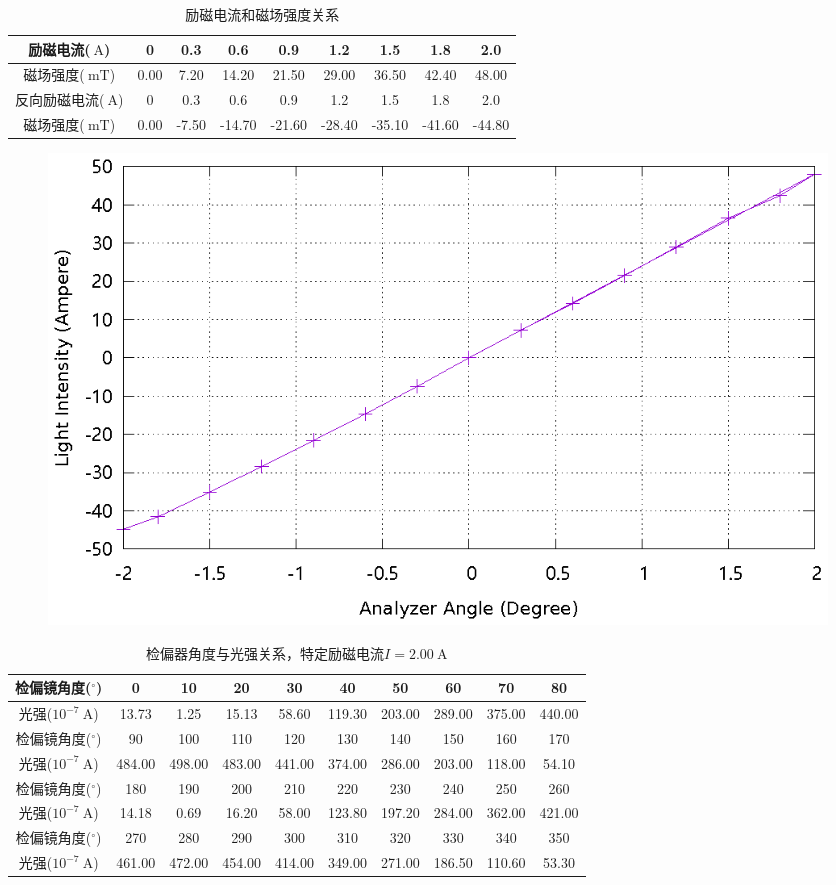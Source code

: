 \documentclass{ctexart}
\newcommand{\si}[1]{\  \mathrm{#1}}
\begin{document}
\newpage
\begin{table}[H]
    \centering
    \begin{tabular}{|c|c|c|c|c|c|c|c|c|}
        \hline
        励磁电流($\si{A}$)   & 0   & 0.3 & 0.6 & 0.9 & 1.2 & 1.5 & 1.8 & 2.0 \\\hline
        磁场强度($\si{mT}$)  & 0.00 & 7.20 & 14.20 & 21.50 & 29.00 & 36.50 & 42.40 & 48.00 \\\hline
        反向励磁电流($\si{A}$) & 0   & 0.3 & 0.6 & 0.9 & 1.2 & 1.5 & 1.8 & 2.0 \\\hline
        磁场强度($\si{mT}$)  & 0.00 & -7.50 & -14.70 & -21.60 & -28.40 & -35.10 & -41.60 & -44.80 \\\hline
    \end{tabular}
    \caption{励磁电流和磁场强度关系}
\end{table}
\begin{figure}[H]
    \centering
    \includegraphics[width=0.9\linewidth]{../output/current-mfield.gnuplot}
\end{figure}
\newpage
\begin{table}[H]
    \centering
    \begin{tabular}{|c|c|c|c|c|c|c|c|c|c|}
        \hline
        检偏镜角度(${}^{\circ}$)  & 0   & 10  & 20  & 30  & 40  & 50  & 60  & 70  & 80  \\\hline
        光强($10^{-7} \si{A}$) & 13.73 & 1.25 & 15.13 & 58.60 & 119.30 & 203.00 & 289.00 & 375.00 & 440.00 \\\hline
        检偏镜角度(${}^{\circ}$)  & 90  & 100 & 110 & 120 & 130 & 140 & 150 & 160 & 170 \\\hline
        光强($10^{-7} \si{A}$) & 484.00 & 498.00 & 483.00 & 441.00 & 374.00 & 286.00 & 203.00 & 118.00 & 54.10 \\\hline
        检偏镜角度(${}^{\circ}$)  & 180 & 190 & 200 & 210 & 220 & 230 & 240 & 250 & 260 \\\hline
        光强($10^{-7} \si{A}$) & 14.18 & 0.69 & 16.20 & 58.00 & 123.80 & 197.20 & 284.00 & 362.00 & 421.00 \\\hline
        检偏镜角度(${}^{\circ}$)  & 270 & 280 & 290 & 300 & 310 & 320 & 330 & 340 & 350 \\\hline
        光强($10^{-7} \si{A}$) & 461.00 & 472.00 & 454.00 & 414.00 & 349.00 & 271.00 & 186.50 & 110.60 & 53.30 \\\hline
    \end{tabular}
    \caption{检偏器角度与光强关系，特定励磁电流$I=2.00 \si{A}$}
\end{table}
\end{document}
